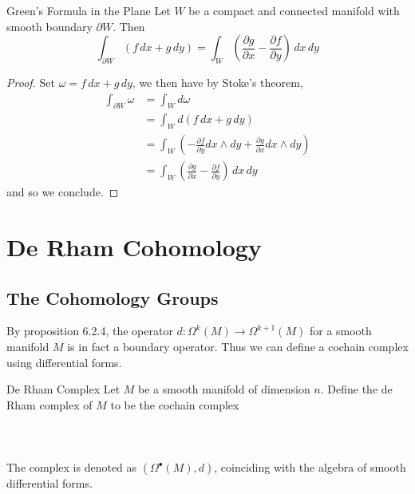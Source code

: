 \documentclass[a4paper]{article}
\begin{document}
\begin{eg}{Green's Formula in the Plane}{} Let $W$ be a compact and connected manifold with smooth boundary $\partial W$. Then $$\int_{\partial W}(f\,dx+g\,dy)=\int_W\left(\frac{\partial g}{\partial x}-\frac{\partial f}{\partial y}\right)\,dx\,dy$$ \tcbline
\begin{proof}
Set $\omega=f\,dx+g\,dy$, we then have by Stoke's theorem, 
\begin{align*}
\int_{\partial W}\omega&=\int_Wd\omega\\
&=\int_Wd(f\,dx+g\,dy)\\
&=\int_W\left(-\frac{\partial f}{\partial y}dx\wedge dy+\frac{\partial g}{\partial x}dx\wedge dy\right)\\
&=\int_W\left(\frac{\partial g}{\partial x}-\frac{\partial f}{\partial y}\right)\,dx\,dy
\end{align*}
and so we conclude. 
\end{proof}
\end{eg}

\pagebreak
\section{De Rham Cohomology}
\subsection{The Cohomology Groups}
By proposition 6.2.4, the operator $d:\Omega^k(M)\to\Omega^{k+1}(M)$ for a smooth manifold $M$ is in fact a boundary operator. Thus we can define a cochain complex using differential forms. 

\begin{defn}{De Rham Complex}{} Let $M$ be a smooth manifold of dimension $n$. Define the de Rham complex of $M$ to be the cochain complex \\~\\
\\~\\ 
The complex is denoted as $(\Omega^\bullet(M),d)$, coinciding with the algebra of smooth differential forms. 
\end{defn}
\end{document}
